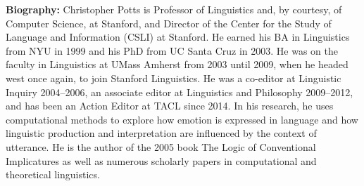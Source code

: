 \vspace{3em}

\vfill{}
\noindent \textbf{Biography:}  Christopher Potts is Professor of Linguistics and, by courtesy, of Computer Science, at Stanford, and Director of the Center for the Study of Language and Information (CSLI) at Stanford. He earned his BA in Linguistics from NYU in 1999 and his PhD from UC Santa Cruz in 2003. He was on the faculty in Linguistics at UMass Amherst from 2003 until 2009, when he headed west once again, to join Stanford Linguistics. He was a co-editor at Linguistic Inquiry 2004–2006, an associate editor at Linguistics and Philosophy 2009–2012, and has been an Action Editor at TACL since 2014. In his research, he uses computational methods to explore how emotion is expressed in language and how linguistic production and interpretation are influenced by the context of utterance. He is the author of the 2005 book The Logic of Conventional Implicatures as well as numerous scholarly papers in computational and theoretical linguistics.

\clearpage{}








%

%

\newpage



